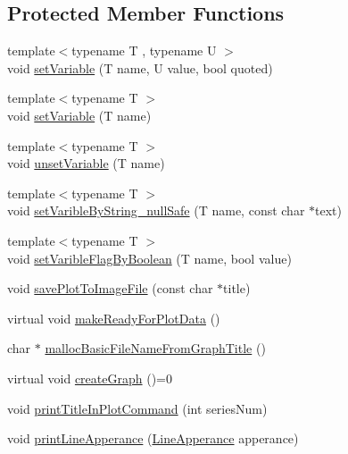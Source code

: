 \subsection*{Protected Member Functions}
\begin{DoxyCompactItemize}
\item 
{\footnotesize template$<$typename T , typename U $>$ }\\void \hyperlink{class_g_n_u_plot_base_a03d371b0c6c7ef89064525438b22d52c}{set\+Variable} (T name, U value, bool quoted)
\item 
{\footnotesize template$<$typename T $>$ }\\void \hyperlink{class_g_n_u_plot_base_a3c8c8f68c13661d91bd844589e1a2a85}{set\+Variable} (T name)
\item 
{\footnotesize template$<$typename T $>$ }\\void \hyperlink{class_g_n_u_plot_base_af9b418bbcafb41d4d51b92018ca4f217}{unset\+Variable} (T name)
\item 
{\footnotesize template$<$typename T $>$ }\\void \hyperlink{class_g_n_u_plot_base_a68171bf36461e54e2b81384c112ad975}{set\+Varible\+By\+String\+\_\+null\+Safe} (T name, const char $\ast$text)
\item 
{\footnotesize template$<$typename T $>$ }\\void \hyperlink{class_g_n_u_plot_base_ae93c5de3241c2b6b6f703a202dc1d94b}{set\+Varible\+Flag\+By\+Boolean} (T name, bool value)
\item 
void \hyperlink{class_g_n_u_plot_base_ab5c851953dd140cc3ee936a5cd329200}{save\+Plot\+To\+Image\+File} (const char $\ast$title)
\item 
virtual void \hyperlink{class_g_n_u_plot_base_adaf91c191e4d889537d401faeb863485}{make\+Ready\+For\+Plot\+Data} ()
\item 
char $\ast$ \hyperlink{class_g_n_u_plot_base_a7f71f3c616b3a4a854f9118a04c40447}{malloc\+Basic\+File\+Name\+From\+Graph\+Title} ()
\item 
virtual void \hyperlink{class_g_n_u_plot_base_ad877f207d43e6f9cd0aa0ef241e31c24}{create\+Graph} ()=0
\item 
void \hyperlink{class_g_n_u_plot_base_a65ae2b3220034bce21c7feb39a632991}{print\+Title\+In\+Plot\+Command} (int series\+Num)
\item 
void \hyperlink{class_g_n_u_plot_base_ad057969aa7f8bdbe884d6a5d03a29722}{print\+Line\+Apperance} (\hyperlink{struct_line_apperance}{Line\+Apperance} apperance)
\item 

\end{DoxyCompactItemize}
